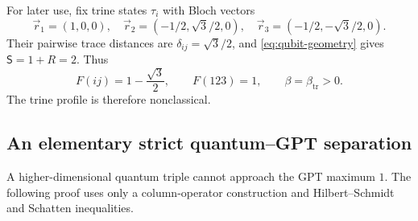 \documentclass[10pt,a4paper]{amsart}
\newcommand{\1}{\mathbf 1}
\newcommand{\Sopt}{\mathsf S}
\newcommand{\btr}{\beta_{\mathrm{tr}}}
\begin{document}
For later use, fix trine states $\tau_i$ with Bloch vectors
\begin{equation}\label{eq:trine-vectors}
 \vec r_1=(1,0,0),\quad
 \vec r_2=(-1/2,\sqrt3/2,0),\quad
 \vec r_3=(-1/2,-\sqrt3/2,0).
\end{equation}
Their pairwise trace distances are $\delta_{ij}=\sqrt3/2$, and
\eqref{eq:qubit-geometry} gives $\Sopt=1+R=2$. Thus
\begin{equation}\label{eq:trine-profile}
 F(ij)=1-\frac{\sqrt3}{2},\qquad F(123)=1,\qquad
 \beta=\btr>0.
\end{equation}
The trine profile is therefore nonclassical.

\subsection{An elementary strict quantum--GPT separation}

A higher-dimensional quantum triple cannot approach the GPT maximum $1$.
The following proof uses only a column-operator construction and
Hilbert--Schmidt and Schatten inequalities.
\end{document}

